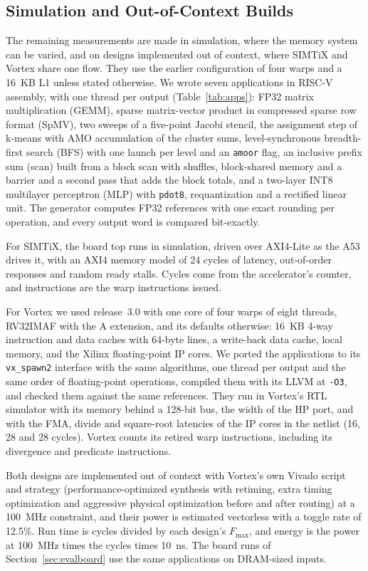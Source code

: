 \documentclass[journal]{IEEEtran}
\newcommand{\Fmax}{$F_{\max}$}
\begin{document}
\subsection{Simulation and Out-of-Context Builds}\label{sec:method}
The remaining measurements are made in simulation, where the memory system can be
varied, and on designs implemented out of context, where SIMTiX and Vortex share one
flow. They use the earlier configuration of four warps and a 16~KB L1 unless stated
otherwise. We wrote seven applications in RISC-V assembly, with one thread per output
(Table~\ref{tab:apps}): FP32 matrix multiplication (GEMM), sparse matrix-vector
product in compressed sparse row format (SpMV), two sweeps of a five-point Jacobi
stencil, the assignment step of k-means with AMO accumulation of the cluster
sums, level-synchronous breadth-first search (BFS) with one launch per level and
an \texttt{amoor} flag, an inclusive prefix sum (scan) built from a block scan
with shuffles, block-shared memory and a barrier and a second pass that adds the
block totals, and a two-layer INT8 multilayer perceptron (MLP) with
\texttt{pdot8}, requantization and a rectified linear unit. The generator computes
FP32 references with one exact rounding per operation, and every output word is
compared bit-exactly.

For SIMTiX, the board top runs in simulation, driven over AXI4-Lite as the A53
drives it, with an AXI4 memory model of 24 cycles of latency, out-of-order
responses and random ready stalls. Cycles come from the accelerator's counter,
and instructions are the warp instructions issued.

For Vortex we used release~3.0 with one core of four warps of eight threads,
RV32IMAF with the A extension, and its defaults otherwise: 16~KB 4-way
instruction and data caches with 64-byte lines, a write-back data cache, local
memory, and the Xilinx floating-point IP cores. We ported the applications to its
\texttt{vx\_spawn2} interface with the same algorithms, one thread per output and
the same order of floating-point operations, compiled them with its LLVM at
\texttt{-O3}, and checked them against the same references. They run in Vortex's
RTL simulator with its memory behind a 128-bit bus, the width of the HP port, and
with the FMA, divide and square-root latencies of the IP cores in the netlist (16,
28 and 28 cycles). Vortex counts its retired warp instructions, including its
divergence and predicate instructions.

Both designs are implemented out of context with Vortex's own Vivado script and
strategy (performance-optimized synthesis with retiming, extra timing
optimization and aggressive physical optimization before and after routing) at a
100~MHz constraint, and their power is estimated vectorless with a toggle rate of
12.5\%. Run time is cycles divided by each design's \Fmax, and energy is the power
at 100~MHz times the cycles times 10~ns. The board runs of
Section~\ref{sec:evalboard} use the same applications on DRAM-sized inputs.
\end{document}
